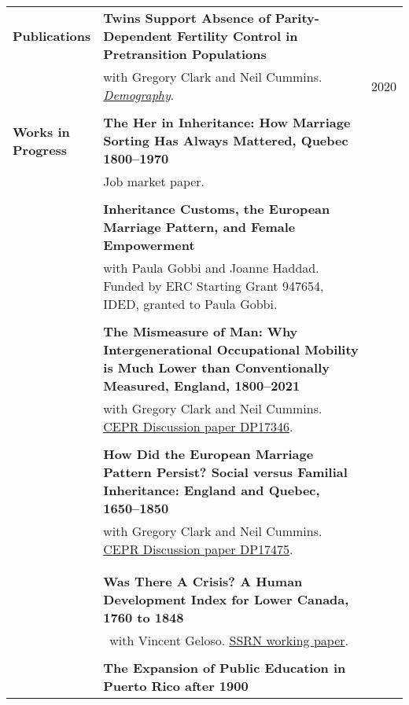 \documentclass[letterpaper,11pt,oneside]{article}
\begin{document}
\begin{longtable}{@{} p{0.15\linewidth} p{0.8\linewidth} p{0.05\linewidth}}
     \textbf{\large{Publications}}   & \textbf{Twins Support Absence of Parity-Dependent Fertility Control in Pretransition Populations }\\
     &  with Gregory Clark and Neil Cummins. \href{https://read.dukeupress.edu/demography/article/57/4/1571/168109/Twins-Support-the-Absence-of-Parity-Dependent}{\emph{Demography}}. & \hfill 2020\\
     \\  
     \textbf{\large{Works in Progress}}  & \textbf{The Her in Inheritance: How Marriage Sorting Has Always Mattered, Quebec 1800--1970}\\ 
     &  Job market paper. &  \\
        & &
       \\
         & \textbf{Inheritance Customs, the European Marriage Pattern, and Female Empowerment}\\ 
  &  with Paula Gobbi and Joanne Haddad. Funded by ERC Starting Grant 947654, IDED, granted to Paula Gobbi. &  \\
     & &
    \\
    & \textbf{The Mismeasure of Man: Why Intergenerational Occupational Mobility  is Much Lower than Conventionally Measured, England, 1800--2021}\\ 
    &  with Gregory Clark and Neil Cummins. \href{https://hub.cepr.org/published-discussion-paper/139739}{CEPR Discussion paper DP17346}. &    \\
       & &
      \\  

 & \textbf{How Did the European Marriage Pattern Persist? Social versus Familial Inheritance: England and Quebec, 1650--1850 }\\ 
     &   with Gregory Clark and Neil Cummins. \href{https://hub.cepr.org/published-discussion-paper/170950}{CEPR Discussion paper DP17475}. & \\
      \\

      \\
     &  \textbf{Was There A Crisis? A Human Development Index for Lower Canada, 1760 to 1848 } \\ 
      &  \ with Vincent Geloso. \href{https://papers.ssrn.com/sol3/papers.cfm?abstract_id=4200516}{SSRN working paper}. &  \\
      \\ 
 
      & \textbf{The Expansion of Public Education in Puerto Rico after 1900} &\\


\end{longtable}
\end{document}
